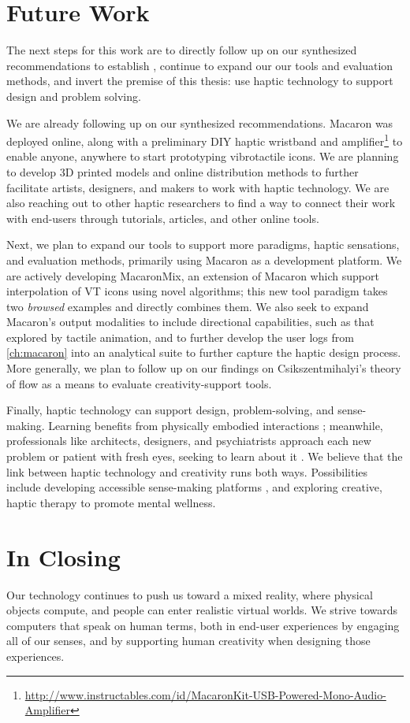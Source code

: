 %
%
\section{Future Work}
The next steps for this work are to directly follow up on our synthesized recommendations to establish \haxd, continue to expand our our tools and evaluation methods, and invert the premise of this thesis: use haptic technology to support design and problem solving.

We are already following up on our synthesized recommendations.
Macaron was deployed online, along with a preliminary DIY haptic wristband and amplifier\footnote{\url{http://www.instructables.com/id/MacaronKit-USB-Powered-Mono-Audio-Amplifier}} to enable anyone, anywhere to start prototyping vibrotactile icons.
We are planning to develop 3D printed models and online distribution methods to further facilitate artists, designers, and makers to work with haptic technology.
We are also reaching out to other haptic researchers to find a way to connect their work with end-users through tutorials, articles, and other online tools.

Next, we plan to expand our tools to support more paradigms, haptic sensations, and evaluation methods, primarily using Macaron as a development platform.
We are actively developing MacaronMix, an extension of Macaron which support interpolation of VT icons using novel algorithms; this new tool paradigm takes two \emph{browsed} examples and directly combines them.
We also seek to expand Macaron's output modalities to include directional capabilities, such as that explored by tactile animation, and to further develop the user logs from \autoref{ch:macaron} into an analytical suite to further capture the haptic design process.
More generally, we plan to follow up on our findings on Csikszentmihalyi's theory of flow \cite{Csikszentmihalyi1996} as a means to evaluate creativity-support tools.

Finally, haptic technology can support design, problem-solving, and sense-making.
Learning benefits from physically embodied interactions \cite{Papert1980}; meanwhile, professionals like architects, designers, and psychiatrists approach each new problem or patient with fresh eyes, seeking to learn about it \cite{Schon1982}.
We believe that the link between haptic technology and creativity runs both ways.
Possibilities include developing accessible sense-making platforms \cite{Swaminathan2016}, and exploring creative, haptic therapy to promote mental wellness.

%
%
\section{In Closing}
Our technology continues to push us toward a mixed reality, where physical objects compute, and people can enter realistic virtual worlds.
We strive towards computers that speak on human terms, both in end-user experiences by engaging all of our senses, and by supporting human creativity when designing those experiences.




\endinput
